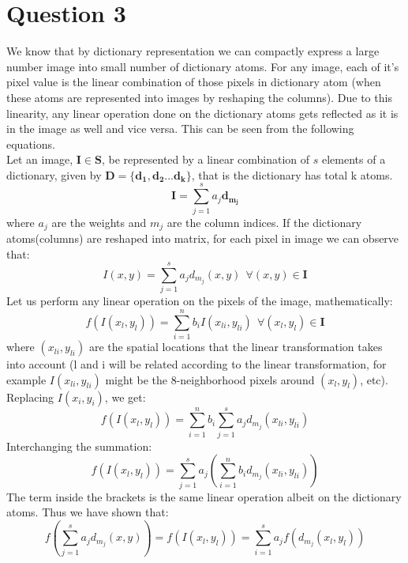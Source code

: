 \documentclass[12pt]{article}
\begin{document}
\section*{Question 3}
We know that by dictionary representation we can compactly express a large number image into small number of dictionary atoms. For any image, each of it's pixel value is the linear combination of those pixels in dictionary atom (when these atoms are represented into images by reshaping the columns). Due to this linearity, any linear operation done on the dictionary atoms gets reflected as it is in the image as well and vice versa. This can be seen from the following equations. \\
Let an image, $\boldsymbol{I} \in \boldsymbol{S}$, be represented by a linear combination of $s$ elements of a dictionary, given by $\boldsymbol{D} = \{\boldsymbol{d_1}, \boldsymbol{d_2}... \boldsymbol{d_k}\}$, that is the dictionary has total k atoms.
\begin{equation*}
	\boldsymbol{I} = \sum_{j=1}^{s} a_j\boldsymbol{d_{m_j}}  
\end{equation*}
where $a_j$ are the weights and $m_j$ are the column indices. If the dictionary atoms(columns) are reshaped into matrix, for each pixel in image we can observe that:
\begin{equation*}
	I(x,y) = \sum_{j=1}^{s} a_jd_{m_j}(x,y) \ \ \forall (x,y) \in \boldsymbol{I}
\end{equation*}
Let us perform any linear operation on the pixels of the image, mathematically:
\begin{equation*}
	f(I(x_l,y_l)) = \sum_{i=1}^{n}b_iI(x_{li},y_{li}) \ \ \forall (x_l,y_l) \in \boldsymbol{I}
\end{equation*}
where $(x_{li}, y_{li})$ are the spatial locations that the linear transformation takes into account (l and i will be related according to the linear transformation, for example $I(x_{li}, y_{li})$ might be the 8-neighborhood pixels around $(x_l, y_l)$, etc). Replacing $I(x_i, y_i)$, we get:
\begin{equation*}
	f(I(x_l,y_l)) = \sum_{i=1}^{n}b_i\sum_{j=1}^{s} a_jd_{m_j}(x_{li},y_{li})
\end{equation*}
Interchanging the summation:
\begin{equation*}
	f(I(x_l,y_l)) = \sum_{j=1}^{s}a_j(\sum_{i=1}^{n}b_i d_{m_j}(x_{li},y_{li}))
\end{equation*}
The term inside the brackets is the same linear operation albeit on the dictionary atoms. Thus we have shown that:
\begin{equation*}
	f(\sum_{j=1}^{s} a_jd_{m_j}(x,y)) = f(I(x_l,y_l)) = \sum_{i=1}^{s}a_jf(d_{m_j}(x_l,y_l)) 
\end{equation*}
\end{document}
